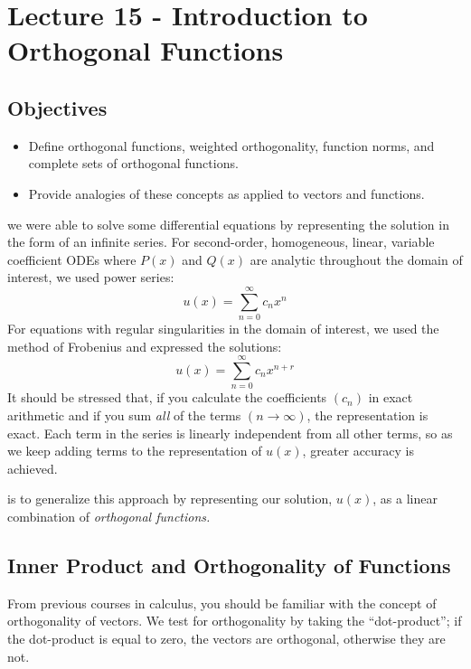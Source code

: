 \chapter{Lecture 15 - Introduction to Orthogonal Functions}
\label{ch:lec15}
\section{Objectives}
\begin{itemize}
\item Define orthogonal functions, weighted orthogonality, function norms, and complete sets of orthogonal functions.
\item Provide analogies of these concepts as applied to vectors and functions.
\end{itemize}

 we were able to solve some differential equations by representing the solution  in the form of an infinite series.  For second-order, homogeneous, linear, variable coefficient ODEs where $P(x)$ and $Q(x)$ are analytic throughout the domain of interest, we used power series:
\begin{equation*}
u(x) = \sum\limits_{n=0}^{\infty}c_nx^n
\end{equation*}
For equations with regular singularities in the domain of interest, we used the method of Frobenius and expressed the solutions:
\begin{equation*}
u(x) = \sum\limits_{n=0}^{\infty}c_nx^{n+r}
\end{equation*}
It should be stressed that, if you calculate the coefficients $(c_n)$ in exact arithmetic and if you sum \emph{all} of the terms $(n\to \infty)$, the representation is exact.  Each term in the series is linearly independent from all other terms, so as we keep adding terms to the representation of $u(x)$, greater accuracy is achieved.  

 is to generalize this approach by representing our solution, $u(x)$, as a linear combination of \emph{orthogonal functions.}

\section{Inner Product and Orthogonality of Functions}
From previous courses in calculus, you should be familiar with the concept of orthogonality of vectors.  We test for orthogonality by taking the ``dot-product''; if the dot-product is equal to zero, the vectors are orthogonal, otherwise they are not.


